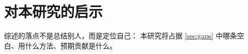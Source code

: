 \section{对本研究的启示}
\label{sec:agenda}

综述的落点不是总结别人，而是定位自己：
本研究将占据 \ref{sec:gaps} 中哪条空白、用什么方法、预期贡献是什么。

